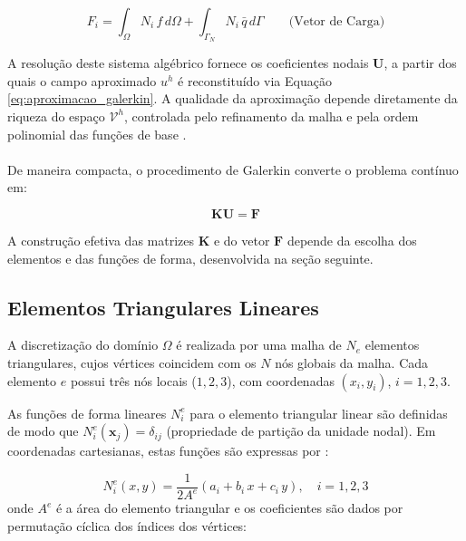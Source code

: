 \begin{equation}
F_i = \int_\Omega N_i \, f \, d\Omega + \int_{\Gamma_N} N_i \, \bar{q} \, d\Gamma \qquad \text{(Vetor de Carga)}
\label{eq:vetor_carga}
\end{equation}

A resolução deste sistema algébrico fornece os coeficientes nodais $\mathbf{U}$, a partir dos quais o campo aproximado $u^h$ é reconstituído via Equação \ref{eq:aproximacao_galerkin}. A qualidade da aproximação depende diretamente da riqueza do espaço $\mathcal{V}^h$, controlada pelo refinamento da malha e pela ordem polinomial das funções de base \cite{Fish2007}.

\paragraph{}De maneira compacta, o procedimento de Galerkin converte o problema contínuo em:

\begin{equation}
\boxed{\mathbf{K} \mathbf{U} = \mathbf{F}}
\label{eq:sistema_global}
\end{equation}

A construção efetiva das matrizes $\mathbf{K}$ e do vetor $\mathbf{F}$ depende da escolha dos elementos e das funções de forma, desenvolvida na seção seguinte.

\subsection{Elementos Triangulares Lineares}
\label{sec:elementos_p1}

A discretização do domínio $\Omega$ é realizada por uma malha de $N_e$ elementos triangulares, cujos vértices coincidem com os $N$ nós globais da malha. Cada elemento $e$ possui três nós locais ($1, 2, 3$), com coordenadas $(x_i, y_i)$, $i = 1, 2, 3$.

As funções de forma lineares $N_i^e$ para o elemento triangular linear são definidas de modo que $N_i^e(\mathbf{x}_j) = \delta_{ij}$ (propriedade de partição da unidade nodal). Em coordenadas cartesianas, estas funções são expressas por \cite{Reddy2005}:

\begin{equation}
N_i^e(x, y) = \frac{1}{2A^e} (a_i + b_i \, x + c_i \, y), \quad i = 1, 2, 3
\label{eq:funcoes_forma_p1}
\end{equation}
onde $A^e$ é a área do elemento triangular e os coeficientes são dados por permutação cíclica dos índices dos vértices:

